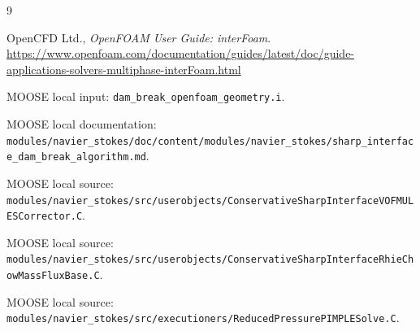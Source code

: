 \documentclass[11pt]{article}
\begin{document}
\begin{thebibliography}{9}

OpenCFD Ltd.,
\emph{OpenFOAM User Guide: interFoam}.
\url{https://www.openfoam.com/documentation/guides/latest/doc/guide-applications-solvers-multiphase-interFoam.html}

MOOSE local input:
\texttt{dam\_break\_openfoam\_geometry.i}.

MOOSE local documentation:
\texttt{modules/navier\_stokes/doc/content/modules/navier\_stokes/sharp\_interface\_dam\_break\_algorithm.md}.

MOOSE local source:
\texttt{modules/navier\_stokes/src/userobjects/ConservativeSharpInterfaceVOFMULESCorrector.C}.

MOOSE local source:
\texttt{modules/navier\_stokes/src/userobjects/ConservativeSharpInterfaceRhieChowMassFluxBase.C}.

MOOSE local source:
\texttt{modules/navier\_stokes/src/executioners/ReducedPressurePIMPLESolve.C}.

\end{thebibliography}
\end{document}
